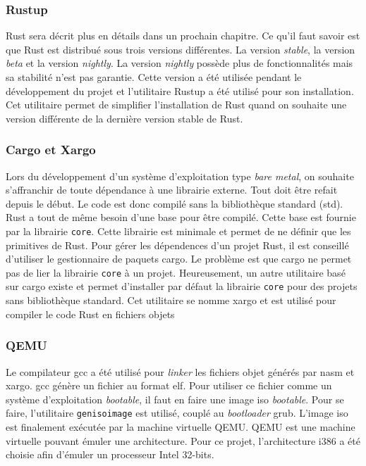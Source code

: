 \documentclass[a4paper]{article}
\begin{document}
\subsubsection{Rustup}
Rust sera décrit plus en détails dans un prochain chapitre. Ce qu'il faut savoir
est que Rust est distribué sous trois versions différentes. La version \textit{stable},
la version \textit{beta} et la version \textit{nightly}. La version \textit{nightly}
possède plus de fonctionnalités mais sa stabilité n'est pas garantie. Cette version
a été utilisée pendant le développement du projet et l'utilitaire Rustup a été utilisé
pour son installation. Cet utilitaire permet de simplifier l'installation de Rust
quand on souhaite une version différente de la dernière version stable de Rust. \\

\subsubsection{Cargo et Xargo}
Lors du développement d'un système d'exploitation type \textit{bare metal}, on souhaite
s'affranchir de toute dépendance à une librairie externe. Tout doit être refait depuis
le début. Le code est donc compilé sans la bibliothèque standard (std). Rust a tout
de même besoin d'une base pour être compilé. Cette base est fournie par la librairie
\texttt{core}. Cette librairie est minimale et permet de ne définir que
les primitives de Rust. Pour gérer les dépendences d'un projet Rust, il est conseillé
d'utiliser le gestionnaire de paquets cargo. Le problème est que cargo ne permet
pas de lier la librairie \texttt{core} à un projet. Heureusement, un 
autre utilitaire basé sur cargo existe et permet d'installer par défaut la librairie
\texttt{core} pour des projets sans bibliothèque standard. Cet utilitaire
se nomme xargo et est utilisé pour compiler le code Rust en fichiers objets \\

\subsubsection{QEMU}
Le compilateur \acrshort{gcc} a été utilisé pour \textit{linker} les fichiers
objet générés par nasm et xargo. \acrshort{gcc} génère un fichier au format \acrshort{elf}.
Pour utiliser ce fichier comme un système d'exploitation \textit{bootable}, il faut
en faire une image \acrshort{iso} \textit{bootable}. Pour se faire, l'utilitaire
\texttt{genisoimage} est utilisé, couplé au \textit{bootloader} \acrshort{grub}.
L'image \acrshort{iso} est finalement exécutée par la machine virtuelle QEMU.
QEMU est une machine virtuelle pouvant émuler une architecture. Pour ce projet,
l'architecture i386 a été choisie afin d'émuler un processeur Intel 32-bits.
\end{document}
